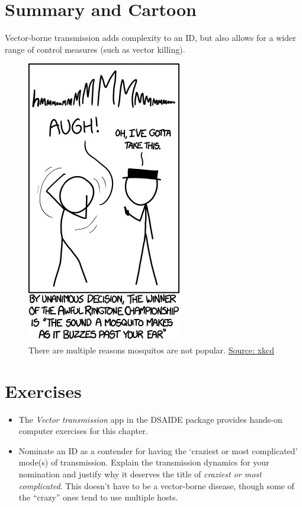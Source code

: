 \documentclass[]{book}
\providecommand{\tightlist}{%
  \setlength{\itemsep}{0pt}\setlength{\parskip}{0pt}}
\theoremstyle{definition}
\theoremstyle{definition}
\theoremstyle{definition}
\theoremstyle{remark}
\begin{document}
\section{Summary and Cartoon}\label{summary-and-cartoon-7}

Vector-borne transmission adds complexity to an ID, but also allows for
a wider range of control measures (such as vector killing).

\begin{figure}
\centering
\includegraphics{./images/xkcd-mosquito-ringtone.png}
\caption{There are multiple reasons mosquitos are not popular.
\href{https://xkcd.com/1241/}{Source: xkcd}}
\end{figure}

\section{Exercises}\label{exercises-7}

\begin{itemize}
\tightlist
\item
  The \emph{Vector transmission} app in the DSAIDE package provides
  hands-on computer exercises for this chapter.
\item
  Nominate an ID as a contender for having the `craziest or most
  complicated' mode(s) of transmission. Explain the transmission
  dynamics for your nomination and justify why it deserves the title of
  \emph{craziest or most complicated}. This doesn't have to be a
  vector-borne disease, though some of the ``crazy'' ones tend to use
  multiple hosts.
\end{itemize}
\end{document}
